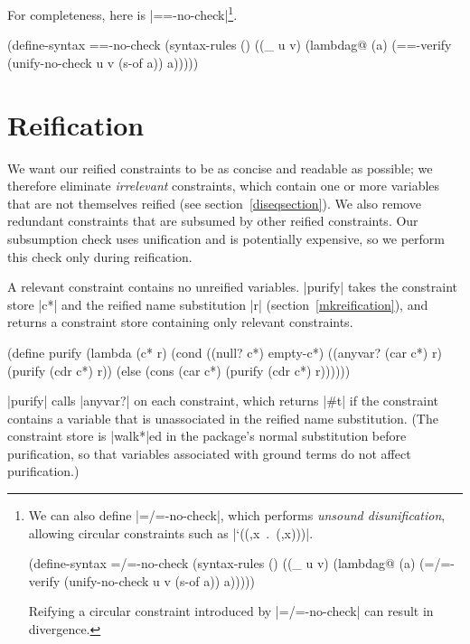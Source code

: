 \enlargethispage{1em}

For completeness, here is \scheme|==-no-check|\footnote{We can also
define \scheme|=/=-no-check|, which performs \emph{unsound disunification},
allowing circular constraints such as \mbox{\scheme|`((,x . (,x)))|}.
\begin{schemedisplay}
(define-syntax =/=-no-check
  (syntax-rules ()
    ((_ u v)
     (lambdag@ (a)
       (=/=-verify (unify-no-check u v (s-of a)) a)))))
\end{schemedisplay}
Reifying a circular constraint introduced by \scheme|=/=-no-check| can result in divergence.}.
\schemedisplayspace
\begin{schemedisplay}
(define-syntax ==-no-check
  (syntax-rules ()
    ((_ u v)
     (lambdag@ (a)
       (==-verify (unify-no-check u v (s-of a)) a)))))
\end{schemedisplay}


\section{Reification}\label{diseqreify}

We want our reified constraints to be as concise and readable as possible;
we therefore eliminate \emph{irrelevant}
constraints, which contain one or more variables
that are not themselves reified (see section~\ref{diseqsection}).  We
also remove redundant constraints that are subsumed by other reified
constraints.  Our subsumption check uses unification and is
potentially expensive, so we perform this check only during
reification.

A relevant constraint contains no unreified variables.
\scheme|purify| takes the constraint store \scheme|c*| and the reified
name substitution \scheme|r| (section~\ref{mkreification}), and
returns a constraint store containing only relevant constraints.

\schemedisplayspace
\begin{schemedisplay}
(define purify
  (lambda (c* r)
    (cond
      ((null? c*) empty-c*)
      ((anyvar? (car c*) r)
       (purify (cdr c*) r))
      (else (cons (car c*)
              (purify (cdr c*) r))))))
\end{schemedisplay}

\scheme|purify| calls \scheme|anyvar?| on each constraint, which
returns \scheme|#t| if the constraint contains a variable that is
unassociated in the reified name substitution.
(The constraint store is \scheme|walk*|ed in the package's normal
substitution before purification, so that variables associated with
ground terms do not affect purification.)

